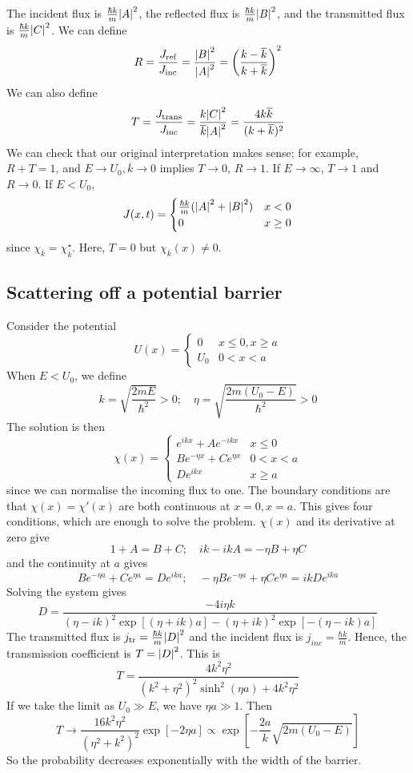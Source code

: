 The incident flux is \( \frac{\hbar k}{m} \abs{A}^2 \), the reflected flux is \( \frac{\hbar k}{m} \abs{B}^2 \), and the transmitted flux is \( \frac{\hbar k}{m} \abs{C}^2 \).
We can define
\[
	R = \frac{J_{\text{ref}}}{J_{\text{inc}}} = \frac{\abs{B}^2}{\abs{A}^2} = \qty(\frac{k - \overline k}{k + \overline k})^2
\]
We can also define
\[
	T = \frac{J_{\text{trans}}}{J_{\text{inc}}} = \frac{k\abs{C}^2}{\overline k\abs{A}^2} = \frac{4k \overline k}{(k + \overline k)^2}
\]
We can check that our original interpretation makes sense; for example, \( R + T = 1 \), and \( E \to U_0, \overline k \to 0 \) implies \( T \to 0 \), \( R \to 1 \).
If \( E \to \infty \), \( T \to 1 \) and \( R \to 0 \).
If \( E < U_0 \),
\[
	J(x,t) =
	\begin{cases}
		\frac{\hbar k}{m} (\abs{A}^2 + \abs{B}^2) & x < 0    \\
		0                                         & x \geq 0
	\end{cases}
\]
since \( \chi_{\overline k} = \chi_{\overline k}^\star \).
Here, \( T = 0 \) but \( \chi_{\overline k}(x) \neq 0 \).

\subsection{Scattering off a potential barrier}
Consider the potential
\[
	U(x) = \begin{cases}
		0   & x \leq 0, x \geq a \\
		U_0 & 0 < x < a
	\end{cases}
\]
When \( E < U_0 \), we define
\[
	k = \sqrt{\frac{2mE}{\hbar^2}} > 0;\quad \eta = \sqrt{\frac{2m(U_0 - E)}{\hbar^2}} > 0
\]
The solution is then
\[
	\chi(x) = \begin{cases}
		e^{ikx} + Ae^{-ikx}        & x \leq 0  \\
		Be^{-\eta x} + Ce^{\eta x} & 0 < x < a \\
		De^{ikx}                   & x \geq a
	\end{cases}
\]
since we can normalise the incoming flux to one.
The boundary conditions are that \( \chi(x) = \chi'(x) \) are both continuous at \( x = 0, x = a \).
This gives four conditions, which are enough to solve the problem.
\( \chi(x) \) and its derivative at zero give
\[
	1 + A = B + C;\quad ik - ikA = -\eta B + \eta C
\]
and the continuity at \( a \) gives
\[
	B e^{-\eta a} + C e^{\eta a} = D e^{ika};\quad -\eta B e^{-\eta a} + \eta C e^{\eta a} = ikD e^{ika}
\]
Solving the system gives
\[
	D = \frac{-4 i \eta k}{(\eta-ik)^2 \exp[(\eta+ik)a] - (\eta+ik)^2\exp[-(\eta-ik)a]}
\]
The transmitted flux is \( j_{\text{tr}} = \frac{\hbar k}{m} \abs{D}^2 \) and the incident flux is \( j_{\textit{inc}} = \frac{\hbar k}{m} \).
Hence, the transmission coefficient is \( T = \abs{D}^2 \).
This is
\[
	T = \frac{4 k^2 \eta^2}{(k^2+\eta^2)^2 \sinh^2(\eta a) + 4 k^2 \eta^2}
\]
If we take the limit as \( U_0 \gg E \), we have \( \eta a \gg 1 \).
Then
\[
	T \to \frac{16k^2 \eta^2}{(\eta^2 + k^2)^2} \exp[-2\eta a] \propto \exp[-\frac{2a}{k} \sqrt{2m(U_0 - E)}]
\]
So the probability decreases exponentially with the width of the barrier.

